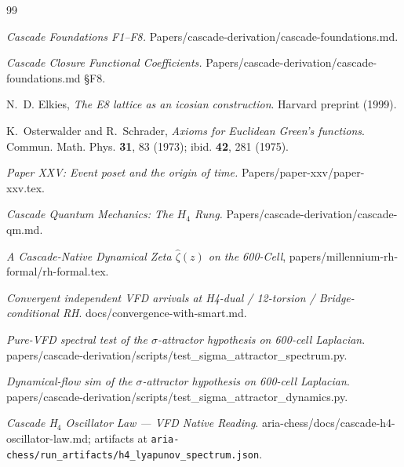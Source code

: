\documentclass[11pt, a4paper]{amsart}
\theoremstyle{definition}
\begin{document}
\begin{thebibliography}{99}

\emph{Cascade Foundations F1--F8.} Papers/cascade-derivation/cascade-foundations.md.

\emph{Cascade Closure Functional Coefficients.} Papers/cascade-derivation/cascade-foundations.md §F8.

N.~D. Elkies, \emph{The E8 lattice as an icosian construction}.
Harvard preprint (1999).

K.~Osterwalder and R.~Schrader, \emph{Axioms for Euclidean Green's functions}.
Commun. Math. Phys. \textbf{31}, 83 (1973); ibid. \textbf{42}, 281 (1975).

\emph{Paper XXV: Event poset and the origin of time.}
Papers/paper-xxv/paper-xxv.tex.

\emph{Cascade Quantum Mechanics: The $H_4$ Rung.}
Papers/cascade-derivation/cascade-qm.md.

\emph{A Cascade-Native Dynamical Zeta $\widehat\zeta(z)$ on the
600-Cell}, papers/millennium-rh-formal/rh-formal.tex.

\emph{Convergent independent VFD arrivals at H4-dual / 12-torsion /
Bridge-conditional RH}. docs/convergence-with-smart.md.

\emph{Pure-VFD spectral test of the $\sigma$-attractor hypothesis on
600-cell Laplacian}.
papers/cascade-derivation/scripts/test\_sigma\_attractor\_spectrum.py.

\emph{Dynamical-flow sim of the $\sigma$-attractor hypothesis on
600-cell Laplacian}.
papers/cascade-derivation/scripts/test\_sigma\_attractor\_dynamics.py.

\emph{Cascade H$_4$ Oscillator Law — VFD Native Reading}.
aria-chess/docs/cascade-h4-oscillator-law.md;
artifacts at \texttt{aria-chess/run\_artifacts/h4\_lyapunov\_spectrum.json}.

\end{thebibliography}
\end{document}
